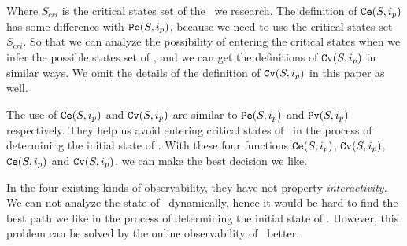 Where $S_{cri}$ is the critical states set of the \BCN\ we research. The definition of ${\tt Ce}(S, i_p)$ has some difference with ${\tt Pe}(S, i_p)$, because we need to use the critical states set $S_{cri}$. So that  we can analyze the possibility of entering the  critical states when we infer the possible states set of \BCNs, and we can get the definitions of ${\tt Cv}(S, i_p)$ in similar ways. We omit the details of the definition of ${\tt Cv}(S, i_p)$ in this paper as well. 

The use of ${\tt Ce}(S, i_p)$ and ${\tt Cv}(S, i_p)$ are similar to ${\tt Pe}(S, i_p)$ and ${\tt Pv}(S, i_p)$ respectively. They help us avoid entering critical states of \BCNs\ in the process of determining the initial state of \BCNs. With these four functions ${\tt Ce}(S, i_p)$, ${\tt Cv}(S, i_p)$, ${\tt Ce}(S, i_p)$ and ${\tt Cv}(S, i_p)$, we can make the best decision we like. 

In the four existing kinds of observability, they have not property {\em interactivity}. We can not analyze the state of \BCNs\ dynamically, hence it would be hard to find the best path we like in the process of determining the initial state of \BCNs. However, this problem can be solved by the online observability of \BCNs\ better.